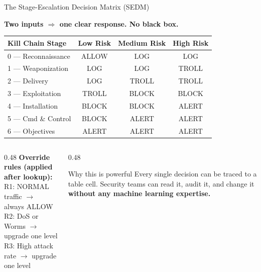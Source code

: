\documentclass[aspectratio=169, 12pt]{beamer}
\begin{document}
\begin{frame}{The Stage-Escalation Decision Matrix (SEDM)}
  \begin{center}
    \textbf{Two inputs $\Rightarrow$ one clear response. No black box.}
  \end{center}
  \vspace{0.2cm}
  \begin{table}
    \centering
    \small
    \begin{tabular}{lccc}
      \toprule
      \textbf{Kill Chain Stage} & \textbf{Low Risk} & \textbf{Medium Risk} & \textbf{High Risk} \\
      \midrule
      0 — Reconnaissance  & ALLOW & LOG   & LOG   \\
      1 — Weaponization   & LOG   & LOG   & TROLL \\
      2 — Delivery        & LOG   & TROLL & TROLL \\
      3 — Exploitation    & TROLL & BLOCK & BLOCK \\
      4 — Installation    & BLOCK & BLOCK & ALERT \\
      5 — Cmd \& Control  & BLOCK & ALERT & ALERT \\
      6 — Objectives      & ALERT & ALERT & ALERT \\
      \bottomrule
    \end{tabular}
  \end{table}
  \vspace{0.2cm}
  \begin{columns}[T]
    \begin{column}{0.48\textwidth}
      \textbf{Override rules (applied after lookup):}\\
      \small
      R1: NORMAL traffic $\to$ always ALLOW\\
      R2: DoS or Worms $\to$ upgrade one level\\
      R3: High attack rate $\to$ upgrade one level
    \end{column}
    \begin{column}{0.48\textwidth}
      \begin{exampleblock}{Why this is powerful}
        Every single decision can be traced to a table cell.
        Security teams can read it, audit it, and change it
        \textbf{without any machine learning expertise.}
      \end{exampleblock}
    \end{column}
  \end{columns}
\end{frame}
\end{document}

